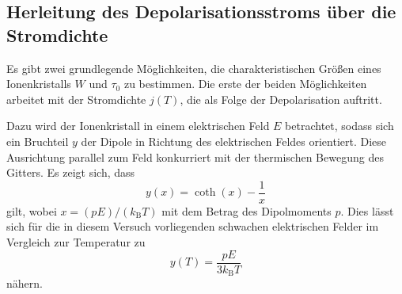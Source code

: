 \subsection{Herleitung des Depolarisationsstroms über die Stromdichte}
Es gibt zwei grundlegende Möglichkeiten, die charakteristischen Größen eines Ionenkristalls $W$ und $\tau_0$ zu bestimmen. Die erste der beiden Möglichkeiten arbeitet mit der Stromdichte $j(T)$, die als Folge der Depolarisation auftritt.

Dazu wird der Ionenkristall in einem elektrischen Feld $E$ betrachtet, sodass sich ein Bruchteil $y$ der Dipole in Richtung des elektrischen Feldes orientiert. Diese Ausrichtung parallel zum Feld konkurriert mit der thermischen Bewegung des Gitters. Es zeigt sich, dass
\begin{equation}
  y(x) = \coth(x) - \frac{1}{x}
  \label{eqn:langevin}
\end{equation}
gilt, wobei $x=(pE)/(k_\text{B}T)$ mit dem Betrag des Dipolmoments $p$.
Dies lässt sich für die in diesem Versuch vorliegenden schwachen elektrischen Felder im Vergleich zur Temperatur zu
\begin{equation}
  y(T) = \frac{pE}{3k_\text{B}T}
  \label{eqn:yApprox}
\end{equation}
nähern.

